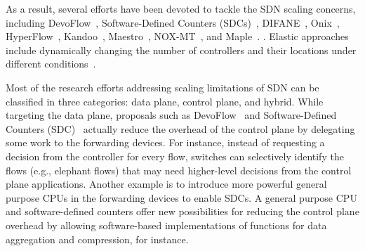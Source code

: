 As a result, several efforts have been devoted to tackle the SDN scaling concerns, including
DevoFlow~\cite{curtis2011}, 
Software-Defined Counters (SDCs)~\cite{mogul2012},
DIFANE~\cite{yu2010-1},
Onix~\cite{koponen-1}, 
HyperFlow~\cite{tootoonchian2010},
Kandoo~\cite{yeganeh2012},
Maestro~\cite{cai2011},
NOX-MT~\cite{tootoonchian2012}, and 
Maple~\cite{voellmy2013}. 
.
Elastic approaches include dynamically changing 
the number of controllers and their locations under different conditions~\cite{bari2013-1}.

Most of the research efforts addressing scaling limitations of SDN can be classified in three categories: data 
plane, control plane, and hybrid.
While targeting the data plane, proposals such as 
DevoFlow~\cite{curtis2011} and Software-Defined Counters 
(SDC)~\cite{mogul2012} actually reduce the overhead of the control plane by delegating some work to the forwarding devices.
For instance, instead of requesting a decision from the
controller for every flow, switches can selectively identify the flows (e.g., elephant flows) that may need higher-level decisions from the control plane applications.
Another example is to introduce 
more powerful general purpose CPUs in the forwarding devices to enable SDCs. 
A general purpose CPU and software-defined counters offer new possibilities for reducing the control plane overhead by allowing 
software-based implementations of functions for data aggregation and compression, for instance.

